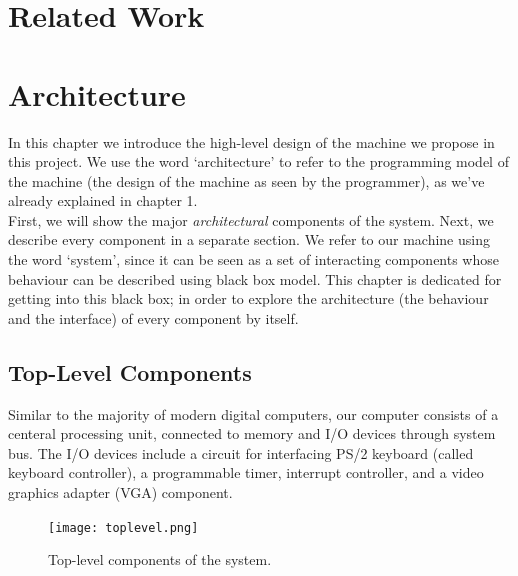 \documentclass[oneside]{book}
\begin{document}


\chapter{Related Work}


\chapter{Architecture}

In this chapter we introduce the high-level design of the machine
we propose in this project. We use the word `architecture' to refer
to the programming model of the machine (the design of the machine as
seen by the programmer), as we've already explained in chapter 1.\\

First, we will show the major \textit{architectural} components of the
system. Next, we describe every component
in a separate section. We refer to our machine using the word `system',
since it can be seen as a set of interacting components whose behaviour can be
described using black box model. This chapter is dedicated for getting
into this black box; in order to explore the architecture (the behaviour
and the interface) of every component by itself.

\section{Top-Level Components}

Similar to the majority of modern digital computers, our computer consists
of a centeral processing unit, connected to memory and I/O devices
through system bus. The I/O devices include a circuit for interfacing
PS/2 keyboard (called keyboard controller), a programmable timer,
interrupt controller, and a video graphics adapter (VGA) component.\\

\begin{figure}[h]
\begin{center}
\texttt{[image: toplevel.png]}
\end{center}
\caption{Top-level components of the system.}
\label{toplevel}
\end{figure}
\end{document}
